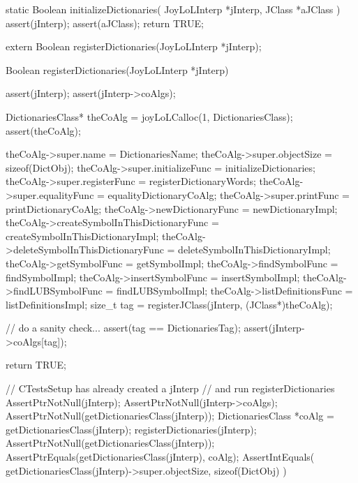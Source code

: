 \stopCHeader

\startCCode
static Boolean initializeDictionaries(
  JoyLoLInterp *jInterp,
  JClass       *aJClass
) {
  assert(jInterp);
  assert(aJClass);
  return TRUE;
}
\stopCCode

\startCHeader
extern Boolean registerDictionaries(JoyLoLInterp *jInterp);
\stopCHeader
{}

\startCCode
Boolean registerDictionaries(JoyLoLInterp *jInterp) {
  assert(jInterp);
  assert(jInterp->coAlgs);
  
  DictionariesClass* theCoAlg
    = joyLoLCalloc(1, DictionariesClass);
  assert(theCoAlg);
  
  theCoAlg->super.name           = DictionariesName;
  theCoAlg->super.objectSize     = sizeof(DictObj);
  theCoAlg->super.initializeFunc = initializeDictionaries;
  theCoAlg->super.registerFunc   = registerDictionaryWords;
  theCoAlg->super.equalityFunc   = equalityDictionaryCoAlg;
  theCoAlg->super.printFunc      = printDictionaryCoAlg;
  theCoAlg->newDictionaryFunc    = newDictionaryImpl;
  theCoAlg->createSymbolInThisDictionaryFunc =
    createSymbolInThisDictionaryImpl;
  theCoAlg->deleteSymbolInThisDictionaryFunc =
    deleteSymbolInThisDictionaryImpl;
  theCoAlg->getSymbolFunc        = getSymbolImpl;
  theCoAlg->findSymbolFunc       = findSymbolImpl;
  theCoAlg->insertSymbolFunc     = insertSymbolImpl;
  theCoAlg->findLUBSymbolFunc    = findLUBSymbolImpl;
  theCoAlg->listDefinitionsFunc  = listDefinitionsImpl;  
  size_t tag =
    registerJClass(jInterp, (JClass*)theCoAlg);
  
  // do a sanity check...
  assert(tag == DictionariesTag);
  assert(jInterp->coAlgs[tag]);
   
  return TRUE;
}
\stopCCode


\startCTest
  // CTestsSetup has already created a jInterp
  // and run registerDictionaries
  AssertPtrNotNull(jInterp);
  AssertPtrNotNull(jInterp->coAlgs);
  AssertPtrNotNull(getDictionariesClass(jInterp));
  DictionariesClass *coAlg = getDictionariesClass(jInterp);
  registerDictionaries(jInterp);
  AssertPtrNotNull(getDictionariesClass(jInterp));
  AssertPtrEquals(getDictionariesClass(jInterp), coAlg);
  AssertIntEquals(
    getDictionariesClass(jInterp)->super.objectSize,
    sizeof(DictObj)
  )
\stopCTest
\stopTestCase
\stopTestSuite
